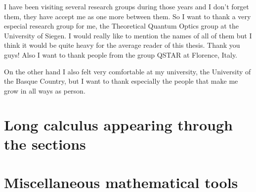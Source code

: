 \documentclass[12pt, letterpaper, twoside]{article}
\numberwithin{equation}{section}
\numberwithin{figure}{section}
\numberwithin{table}{section}
\begin{document}
I have been visiting several research groups during those years and I don't forget them, they have accept me as one more between them.
So I want to thank a very especial research group for me, the Theoretical Quantum Optics group at the University of Siegen.
I would really like to mention the names of all of them but I think it would be quite heavy for the average reader of this thesis.
Thank you guys!
Also I want to thank people from the group QSTAR at Florence, Italy.

On the other hand I also felt very comfortable at my university, the University of the Basque Country, but I want to thank especially the people that make me grow in all ways as person.

\cleardoublepage


\renewcommand{\headrulewidth}{0.5pt}
\fancyfoot[LE,RO]{\thepage}
\fancyhead[LE]{\rightmark}
\fancyhead[RO]{\leftmark}












\appendix

\section{Long calculus appearing through the sections}


\section{Miscellaneous mathematical tools}





\end{document}
